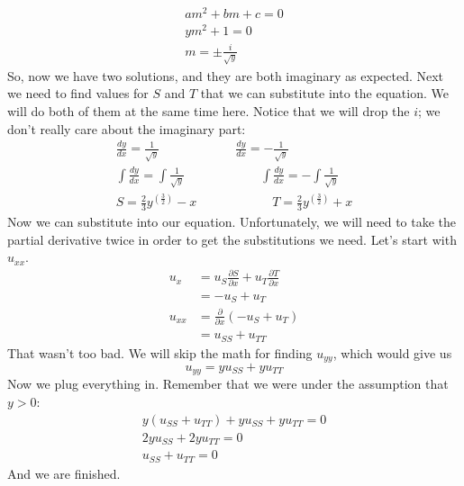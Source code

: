 \documentclass{article}
\begin{document}
\begin{gather*}
am^{2} + bm + c = 0\\
ym^{2} + 1 = 0\\
m = \pm \frac{i}{\sqrt{y}}
\end{gather*}
\noindent So, now we have two solutions, and they are both imaginary as expected. Next we need to find values for $S$ and $T$ that we can substitute into the equation. We will do both of them at the same time here. Notice that we will drop the $i$; we don't really care about the imaginary part:
\begin{gather*}
\frac{dy}{dx} = \frac{1}{\sqrt{y}} \qquad\qquad\qquad \frac{dy}{dx} = -\frac{1}{\sqrt{y}}\\
\int\frac{dy}{dx} =\int\frac{1}{\sqrt{y}} \qquad\qquad\qquad \int\frac{dy}{dx} = -\int\frac{1}{\sqrt{y}}\\
S = \frac{2}{3}y^{\left(\frac{3}{2}\right)} - x \qquad\qquad\qquad T = \frac{2}{3}y^{\left(\frac{3}{2}\right)} + x
\end{gather*}
\noindent Now we can substitute into our equation. Unfortunately, we will need to take the partial derivative twice in order to get the substitutions we need. Let's start with $u_{xx}$.
\begin{align*}
u_{x} &= u_{S}\frac{\partial S}{\partial x} + u_{T}\frac{\partial T}{\partial x}\\
&= -u_{S} + u_{T}\\
u_{xx} &= \frac{\partial}{\partial x}(-u_{S} + u_{T})\\
&= u_{SS} + u_{TT}
\end{align*}
\noindent That wasn't too bad. We will skip the math for finding $u_{yy}$, which would give us
\[
u_{yy} = yu_{SS} + yu_{TT}
\]
\noindent Now we plug everything in. Remember that we were under the assumption that $y > 0$:
\begin{gather*}
y(u_{SS} + u_{TT}) + yu_{SS} + yu_{TT} = 0\\
2yu_{SS} + 2yu_{TT} = 0\\
u_{SS} + u_{TT} = 0
\end{gather*}
\noindent And we are finished.


\newpage
\end{document}
